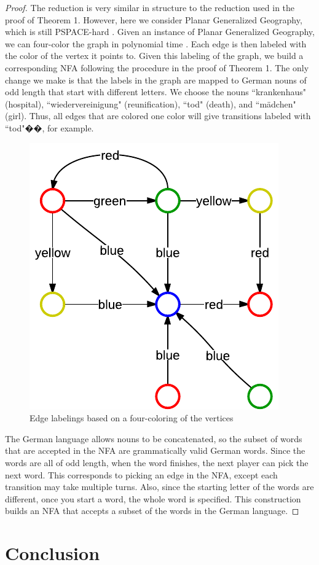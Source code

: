 \documentclass[runningheads,a4paper]{llncs}
\begin{document}
\begin{proof} The reduction is very similar in structure to the reduction used in the proof of Theorem 1. However, here we consider Planar Generalized Geography, which is still PSPACE-hard \cite{Sipser}. Given an instance of Planar Generalized Geography, we can four-color the graph in polynomial time \cite{planargraph}. Each edge is then labeled with the color of the vertex it points to. Given this labeling of the graph, we build a corresponding NFA following the procedure in the proof of Theorem 1. The only change we make is that the labels in the graph are mapped to German nouns of odd length that start with different letters. We choose the nouns ``krankenhaus" (hospital), ``wiedervereinigung" (reunification), ``tod" (death), and ``m{\"a}dchen" (girl). Thus, all edges that are colored one color will give transitions labeled with ``tod"��, for example. 

\begin{figure}
\centering
\includegraphics[width=0.4\linewidth]{Ghost3.pdf}
\caption{Edge labelings based on a four-coloring of the vertices}
\label{fig:reduction}
\end{figure}

	The German language allows nouns to be concatenated, so the subset of words that are accepted in the NFA are grammatically valid German words. Since the words are all of odd length, when the word finishes, the next player can pick the next word. This corresponds to picking an edge in the NFA, except each transition may take multiple turns. Also, since the starting letter of the words are different, once you start a word, the whole word is specified. This construction builds an NFA that accepts a subset of the words in the German language. 
\end{proof}

\section{Conclusion}
\label{Conclusion}
\end{document}
